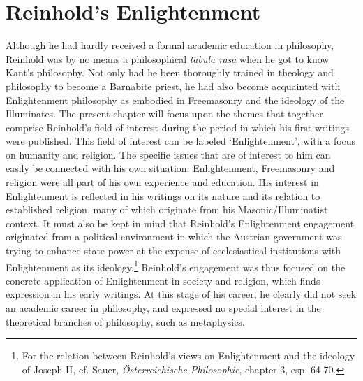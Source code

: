 
\chapter{Reinhold's Enlightenment}


Although he had hardly received a formal academic education in philosophy, Reinhold was by no means a philosophical \textit{tabula rasa} when he got to know Kant's philosophy. Not only had he been thoroughly trained in theology and philosophy to become a Barnabite priest, he had also become acquainted with Enlightenment philosophy as embodied in Freemasonry and the ideology of the Illuminates. The present chapter will focus upon the themes that together comprise Reinhold's field of interest during the period in which his first writings were published. This field of interest can be labeled `Enlightenment', with a focus on humanity and religion. The specific issues that are of interest to him can easily be connected with his own situation: Enlightenment, Freemasonry and religion were all part of his own experience and education. His interest in Enlightenment is reflected in his writings on its nature and its relation to established religion, many of which originate from his Masonic/Illuminatist context. It must also be kept in mind that Reinhold's Enlightenment engagement originated from a political environment in which the Austrian government was trying to enhance state power at the expense of ecclesiastical institutions with Enlightenment as its ideology.\footnote{ For the relation between Reinhold's views on Enlightenment and the ideology of Joseph II, cf. Sauer, \textit{\"{O}sterreichische Philosophie}, chapter 3, esp. 64{-}70.} Reinhold's engagement was thus focused on the concrete application of Enlightenment in society and religion, which finds expression in his early writings. At this stage of his career, he clearly did not seek an academic career in philosophy, and expressed no special interest in the theoretical branches of philosophy, such as metaphysics.

